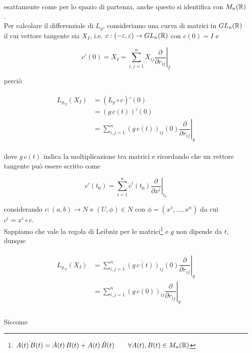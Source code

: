 esattamente come per lo spazio di partenza, anche questo si identifica con $ M_{n}(\mathbb{R}) $.\\
Per calcolare il differenziale di $ L_{g} $, consideriamo una curva di matrici in $ GL_{n}(\mathbb{R}) $ il cui vettore tangente sia $ X_{I} $, i.e. $ c : (-\varepsilon,\varepsilon) \to GL_{n}(\mathbb{R}) $ con $ c(0)=I $ e 

\begin{equation}
	c'(0) = X_{I} = \sum_{i,j=1}^{n} X_{ij} \left. \dfrac{\partial}{\partial r_{ij}} \right|_{I}
\end{equation}

perciò

\begin{align}
	\begin{split}
		L_{g_{*I}}(X_{I}) &= (L_{g} \circ c)'(0)\\
		&= (g \, c(t))'(0)\\
		&= \sum_{i,j=1}^{n} \dot{(g \, c(t))}_{ij}(0) \left. \dfrac{\partial}{\partial r_{ij}} \right|_{g}
	\end{split}
\end{align}

dove $ g \, c(t) $ indica la moltiplicazione tra matrici e ricordando che un vettore tangente può essere scritto come

\begin{equation}
	c'(t_{0}) = \sum_{i=1}^{n} \dot{c}^{i}(t_{0}) \left. \dfrac{\partial}{\partial x^{i}} \right|_{t_{0}}
\end{equation}

considerando $ c : (a,b) \to N $ e $ (U,\phi) \in N $ con $ \phi=(x^{1},\dots,x^{n}) $ da cui $ c^{i} = x^{i} \circ c $.\\
Sappiamo che vale la regola di Leibniz per le matrici\footnote{%
	$ \dot{A(t) \, B(t)} = \dot{A}(t) \, B(t) + A(t) \, \dot{B}(t) \qquad \forall A(t),B(t) \in M_{n}(\mathbb{R}) $%
} e $ g $ non dipende da $ t $, dunque

\begin{align}
	\begin{split}
		L_{g_{*I}}(X_{I}) &= \sum_{i,j=1}^{n} \dot{(g \, c(t))}_{ij}(0) \left. \dfrac{\partial}{\partial r_{ij}} \right|_{g}\\
		&= \sum_{i,j=1}^{n} (g \, \dot{c}(0))_{ij} \left. \dfrac{\partial}{\partial r_{ij}} \right|_{g}\\
	\end{split}
\end{align}

Siccome

